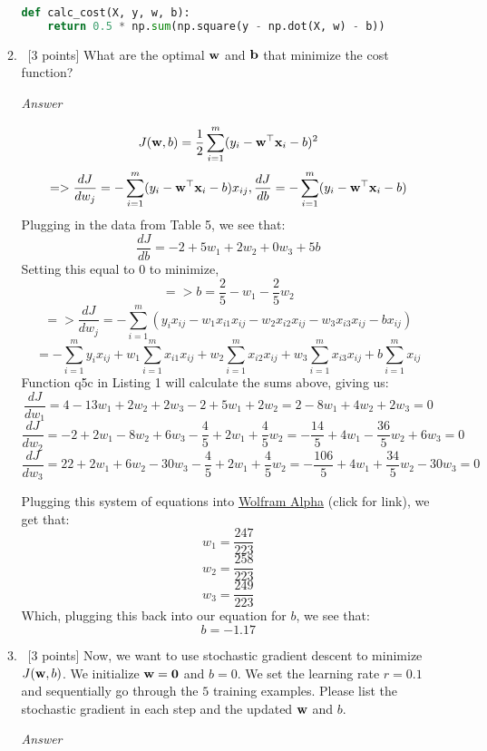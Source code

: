 \documentclass[12pt, fullpage,letterpaper]{article}
\begin{document}
\begin{enumerate}
\begin{enumerate}
\begin{lstlisting}[language=Python, caption=QuestionAnswers.part1]
def calc_cost(X, y, w, b):
    return 0.5 * np.sum(np.square(y - np.dot(X, w) - b))


	\end{lstlisting}
	
	\item~[3 points] What are the optimal ${\bf w}$ and ${\bf b}$ that minimize the cost function? 
	
	\emph{Answer}
	
	\[
	    J({\bf w}, b) = \frac{1}{2} \sum_{i=1}^m (y_i - {\bf w}^\top {\bf x}_i - b)^2
	\]
	\[
        => \frac{dJ}{dw_j} = -\sum_{i=1}^m (y_i - {\bf w}^\top {\bf x}_i - b)x_{ij},  \frac{dJ}{db} = -\sum_{i=1}^m (y_i - {\bf w}^\top {\bf x}_i - b)
    \]
    Plugging in the data from Table 5, we see that:
    \[
       \frac{dJ}{db} = -2 + 5w_1 +2 w_2 + 0w_3 + 5b
    \]
    Setting this equal to 0 to minimize,
    \[
        => b = \frac{2}{5} - w_1 - \frac{2}{5}w_2
    \]
    \[
        => \frac{dJ}{dw_j} = -\sum_{i=1}^m (y_i x_{ij} - w_1 x_{i1} x_{ij} - w_2 x_{i2} x_{ij} - w_3 x_{i3} x_{ij} - b x_{ij})
    \]
    \[
        = -\sum_{i=1}^m y_i x_{ij} + w_1\sum_{i=1}^m x_{i1} x_{ij} + w_2\sum_{i=1}^m x_{i2} x_{ij} + w_3\sum_{i=1}^m x_{i3} x_{ij} + b\sum_{i=1}^m x_{ij}
    \]
    Function q5c in Listing 1 will calculate the sums above, giving us:
    \[
        \frac{dJ}{dw_1} = 4 - 13w_1 + 2w_2 + 2w_3 - 2 + 5w_1 + 2w_2 = 2 - 8w_1 + 4w_2 + 2w_3 = 0
    \]
    \[
        \frac{dJ}{dw_2} = -2 + 2w_1 - 8w_2 + 6w_3 - \frac{4}{5} + 2w_1 + \frac{4}{5}w_2 = -\frac{14}{5} + 4w_1 - \frac{36}{5}w_2 + 6w_3 = 0
    \]
    \[
        \frac{dJ}{dw_3} = 22 + 2w_1 + 6w_2 - 30w_3 - \frac{4}{5} + 2w_1 + \frac{4}{5}w_2 = -\frac{106}{5} + 4w_1 + \frac{34}{5}w_2 - 30w_3 = 0
    \]
    
    Plugging this system of equations into \href{https://www.wolframalpha.com/input/?i=systems+of+equations+calculator}{Wolfram Alpha} (click for link), we get that:
    \[
        w_1 = \frac{247}{223}
    \]
    \[
        w_2 = \frac{258}{223}
    \]
    \[
        w_3 = \frac{249}{223}
    \]
    Which, plugging this back into our equation for $b$, we see that:
    \[
        b = -1.17
    \]
	
	\item~[3 points] Now, we want to use stochastic gradient descent to minimize $J({\bf w}, b)$. We initialize ${\bf w} = {\bf 0}$ and $b = 0$. We set the learning rate $r = 0.1$ and sequentially go through the $5$ training examples. Please list the stochastic gradient in each step and the updated ${\bf w}$ and $b$. 
	
	\emph{Answer}
	

\end{enumerate}
\end{enumerate}
\end{document}
